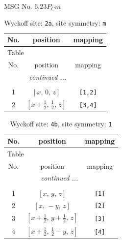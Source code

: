 \documentclass[fleqn,8pt]{jsarticle}
\begin{document}
\setcounter{MaxMatrixCols}{32}

\renewcommand{\tablename}{Table~}
\renewcommand{\figurename}{Figure~}
\begin{center}
\LARGE
MSG No. 6.23\quad$P_{C}m$
\end{center}
\renewcommand{\arraystretch}{1.2}
\begin{longtable}{ccc}
\caption{Wyckoff site: {\tt 2a}, site symmetry: {\tt m}}
 \\
 \hline \hline
No. & position & mapping \\ \hline \endfirsthead

\multicolumn{2}{l}{\tablename\ \thetable{}} \\
 \hline \hline
No. & position & mapping \\ \hline \endhead

 \hline \hline
\multicolumn{2}{r}{\footnotesize\it continued ...} \\ \endfoot

 \hline \hline
\multicolumn{2}{r}{} \\ \endlastfoot

1 & $\left[ x,\, 0,\, z \right]$ & {\tt [1,2]} \\ \hline
2 & $\left[ x + \frac{1}{2},\, \frac{1}{2},\, z \right]$ & {\tt [3,4]} \\
\end{longtable}
\renewcommand{\arraystretch}{1.2}
\begin{longtable}{ccc}
\caption{Wyckoff site: {\tt 4b}, site symmetry: {\tt 1}}
 \\
 \hline \hline
No. & position & mapping \\ \hline \endfirsthead

\multicolumn{2}{l}{\tablename\ \thetable{}} \\
 \hline \hline
No. & position & mapping \\ \hline \endhead

 \hline \hline
\multicolumn{2}{r}{\footnotesize\it continued ...} \\ \endfoot

 \hline \hline
\multicolumn{2}{r}{} \\ \endlastfoot

1 & $\left[ x,\, y,\, z \right]$ & {\tt [1]} \\ \hline
2 & $\left[ x,\, - y,\, z \right]$ & {\tt [2]} \\ \hline
3 & $\left[ x + \frac{1}{2},\, y + \frac{1}{2},\, z \right]$ & {\tt [3]} \\ \hline
4 & $\left[ x + \frac{1}{2},\, \frac{1}{2} - y,\, z \right]$ & {\tt [4]} \\
\end{longtable}
\end{document}
